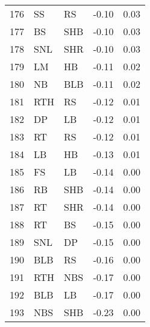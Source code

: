\begin{table}[ht]
\begin{tabular}{rllrr}
  176 & SS & RS & -0.10 & 0.03 \\ 
  177 & BS & SHB & -0.10 & 0.03 \\ 
  178 & SNL & SHR & -0.10 & 0.03 \\ 
  179 & LM & HB & -0.11 & 0.02 \\ 
  180 & NB & BLB & -0.11 & 0.02 \\ 
  181 & RTH & RS & -0.12 & 0.01 \\ 
  182 & DP & LB & -0.12 & 0.01 \\ 
  183 & RT & RS & -0.12 & 0.01 \\ 
  184 & LB & HB & -0.13 & 0.01 \\ 
  185 & FS & LB & -0.14 & 0.00 \\ 
  186 & RB & SHB & -0.14 & 0.00 \\ 
  187 & RT & SHR & -0.14 & 0.00 \\ 
  188 & RT & BS & -0.15 & 0.00 \\ 
  189 & SNL & DP & -0.15 & 0.00 \\ 
  190 & BLB & RS & -0.16 & 0.00 \\ 
  191 & RTH & NBS & -0.17 & 0.00 \\ 
  192 & BLB & LB & -0.17 & 0.00 \\ 
  193 & NBS & SHB & -0.23 & 0.00 \\ 
   \hline
\end{tabular}
\end{table}
